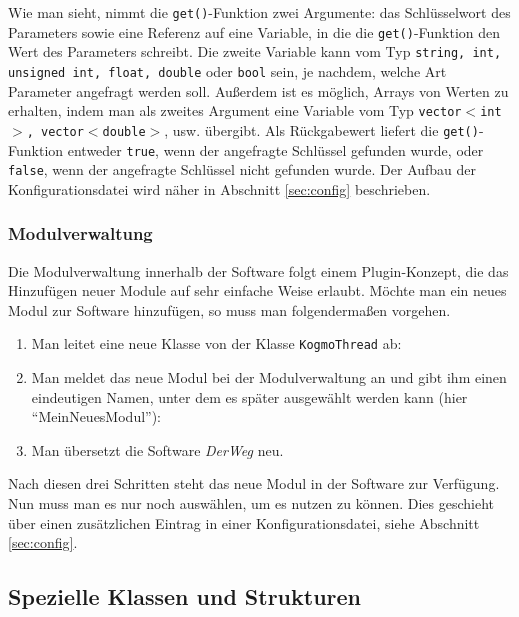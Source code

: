 \documentclass[a4paper, 11pt]{article}
\newcommand{\code}[1]{\texttt{#1}}
\newcommand{\codeex}[2][0.98\textwidth]{\vspace*{1ex}\noindent\fbox{\parbox{#1}{}}\vspace*{1ex}}
\newcommand{\DerWeg}{\textit{DerWeg }}  %
\begin{document}
{\codeex{beispielConfigReaderAnfrage.cpp}

Wie man sieht, nimmt die \code{get()}-Funktion zwei Argumente: das Schlüsselwort des Parameters sowie eine Referenz auf eine Variable, in die die \code{get()}-Funktion den Wert des Parameters schreibt. Die zweite Variable kann vom Typ \code{string, int, unsigned int, float, double} oder \code{bool} sein, je nachdem, welche Art Parameter angefragt werden soll. Außerdem ist es möglich, Arrays von Werten zu erhalten, indem man als zweites Argument eine Variable vom Typ \code{vector$<$int$>$, vector$<$double$>$}, usw. übergibt. Als Rückgabewert liefert die \code{get()}-Funktion entweder \code{true}, wenn der angefragte Schlüssel gefunden wurde, oder \code{false}, wenn der angefragte Schlüssel nicht gefunden wurde. Der Aufbau der Konfigurationsdatei wird näher in Abschnitt \ref{sec:config} beschrieben.


\subsubsection{Modulverwaltung}
Die Modulverwaltung innerhalb der Software folgt einem Plugin-Konzept, die das Hinzufügen neuer Module auf sehr einfache Weise erlaubt. Möchte man ein neues Modul zur Software hinzufügen, so muss man folgendermaßen vorgehen.
\begin{enumerate}
\item Man leitet eine neue Klasse von der Klasse \code{KogmoThread} ab:

\codeex[0.9\textwidth]{beispielModulAbleiten.cpp}

\item Man meldet das neue Modul bei der Modulverwaltung an und gibt ihm einen eindeutigen Namen, unter dem es später ausgewählt werden kann (hier "`MeinNeuesModul"'):

\codeex[0.9\textwidth]{beispielModulAnmelden.cpp}

\item Man übersetzt die Software \DerWeg neu.
\end{enumerate}
Nach diesen drei Schritten steht das neue Modul in der Software zur Verfügung. Nun muss man es nur noch auswählen, um es nutzen zu können. Dies geschieht über einen zusätzlichen Eintrag in einer Konfigurationsdatei, siehe Abschnitt \ref{sec:config}.


\subsection{Spezielle Klassen und Strukturen}

}
\end{document}
